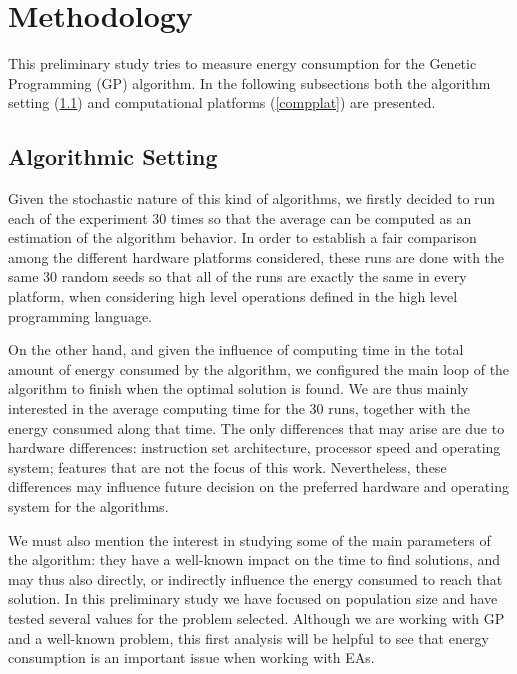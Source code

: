 \section{Methodology}
\label{methodology}

This preliminary study tries to measure energy consumption for 
the Genetic Programming (GP) algorithm. In the following subsections
both the algorithm setting (\ref{algsetting}) and computational
platforms (\ref{compplat}) are presented. 

\subsection{Algorithmic Setting}
\label{algsetting}

Given the stochastic nature of this kind of algorithms, we firstly
decided to run each of the experiment 30 times so that the average can
be computed as an estimation of the algorithm behavior. In order to
establish a fair comparison among the different hardware platforms
considered, these runs are done with the same 30 random seeds so that
all of the runs are exactly the same in every platform, when
considering high level operations defined in the high level
programming language. 

On the other hand, and given the influence of computing time in the
total amount of energy consumed by the algorithm, we configured the
main loop of the algorithm to finish when  
the optimal solution is found.  We are thus mainly interested in the
average computing time for the 30 runs, together with the energy
consumed along that time.  The only differences that may arise are due
to hardware differences:  instruction set architecture, processor
speed and operating system;  %
features that are not the focus of this work.  Nevertheless, these
differences may influence future decision on the preferred hardware
and operating system for the algorithms.

We must also mention the interest in studying some of the main
parameters of the algorithm:  they have a well-known impact on the
time to find solutions, and may thus also directly, or indirectly
influence the energy consumed to reach that solution.  In this
preliminary study we have focused on population size and have tested
several values for the problem selected.  Although we are working with
GP and a well-known problem, this first analysis will be helpful to
see that energy consumption is an important issue when working with
EAs. 

